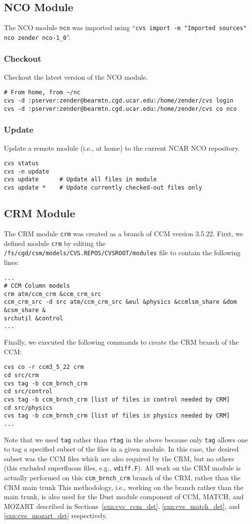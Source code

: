\documentclass[12pt,twoside]{article}
\begin{document}
\subsection{NCO Module}\label{sxn:cvs_nco}

The NCO module \verb'nco' was imported using ``\texttt{cvs import -m
"Imported sources" nco zender nco-1\_0}''. 

\subsubsection[Checkout]{Checkout}
Checkout the latest version of the NCO module. 
\begin{verbatim}
# From home, from ~/nc
cvs -d :pserver:zender@bearmtn.cgd.ucar.edu:/home/zender/cvs login
cvs -d :pserver:zender@bearmtn.cgd.ucar.edu:/home/zender/cvs co nco
\end{verbatim}

\subsubsection[Update]{Update}
Update a remote module (i.e., at home) to the current NCAR NCO
repository. 
\begin{verbatim}
cvs status
cvs -n update
cvs update      # Update all files in module
cvs update *    # Update currently checked-out files only
\end{verbatim}

\subsection{CRM Module}\label{sxn:cvs_ccm_crm}

The CRM module \verb'crm' was created as a branch of CCM version
3.5.22.
First, we defined module \verb'crm' by editing the
\verb'/fs/cgd/csm/models/CVS.REPOS/CVSROOT/modules' file to contain
the following lines: 
\begin{verbatim}
...
# CCM Column models
crm atm/ccm_crm &ccm_crm_src
ccm_crm_src -d src atm/ccm_crm_src &eul &physics &ccmlsm_share &dom &csm_share &
srchutil &control
...
\end{verbatim}
Finally, we executed the following commands to create the CRM branch
of the CCM:
\begin{verbatim}
cvs co -r ccm3_5_22 crm
cd src/crm
cvs tag -b ccm_brnch_crm 
cd src/control
cvs tag -b ccm_brnch_crm [list of files in control needed by CRM]
cd src/physics
cvs tag -b ccm_brnch_crm [list of files in physics needed by CRM]
...
\end{verbatim}
Note that we used \verb'tag' rather than \verb'rtag' in the above
because only \verb'tag' allows one to tag a specified subset of the
files in a given module.
In this case, the desired subset was the CCM files which are also
required by the CRM, but no others (this excluded superfluous files,
e.g., \verb'vdiff.F').
All work on the CRM module is actually performed on this
\verb'ccm_brnch_crm' branch of the CRM, rather than the CRM main trunk
This methodology, i.e., working on the branch rather than the main
trunk, is also used for the Dust module component of CCM, MATCH, and
MOZART described in Sections~\ref{sxn:cvs_ccm_dst}, \ref{sxn:cvs_match_dst},
and \ref{sxn:cvs_mozart_dst} respectively.  
\end{document}
